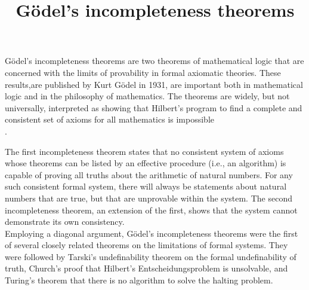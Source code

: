 \documentclass[10pts]{article}
\begin{document}
\title{Gödel's incompleteness theorems}
\maketitle
Gödel's incompleteness theorems are two theorems of mathematical logic that are concerned with the limits of provability in formal axiomatic theories. These results,are published by Kurt Gödel in 1931, are important both in mathematical logic and in the philosophy of mathematics. The theorems are widely, but not universally, interpreted as showing that Hilbert's program to find a complete and consistent set of axioms for all mathematics is impossible\\.

The first incompleteness theorem states that no consistent system of axioms whose theorems can be listed by an effective procedure (i.e., an algorithm) is capable of proving all truths about the arithmetic of natural numbers. For any such consistent formal system, there will always be statements about natural numbers that are true, but that are unprovable within the system. The second incompleteness theorem, an extension of the first, shows that the system cannot demonstrate its own consistency.\\

Employing a diagonal argument, Gödel's incompleteness theorems were the first of several closely related theorems on the limitations of formal systems. They were followed by Tarski's undefinability theorem on the formal undefinability of truth, Church's proof that Hilbert's Entscheidungsproblem is unsolvable, and Turing's theorem that there is no algorithm to solve the halting problem.\\
\end{document}
